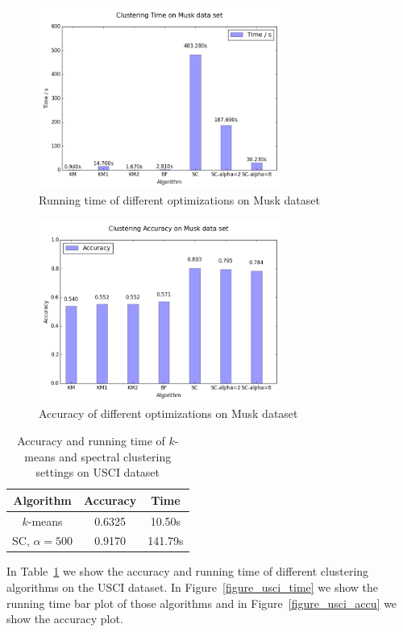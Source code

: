 \documentclass{acm_proc_article-sp}
\begin{document}
\begin{figure}
\centering
\includegraphics[height=6cm]{mt.png}
\caption{Running time of different optimizations on Musk dataset}
\label{figure_musk_time}
\end{figure}

\begin{figure}
\centering
\includegraphics[height=6cm]{ma.png}
\caption{Accuracy of different optimizations on Musk dataset}
\label{figure_musk_accu}
\end{figure}


\begin{table}
\centering
\begin{tabular}{|c|cc|}
\hline
Algorithm & Accuracy & Time \\
\hline
 $k$-means & 0.6325 & 10.50s\\
 SC, $\alpha=500$ & 0.9170 & 141.79s\\
 \hline
\end{tabular}
\caption{Accuracy and running time of $k$-means and spectral clustering settings on USCI dataset}
\label{table_usci}
\end{table}


In Table~\ref{table_usci} we show the accuracy and running time of different clustering algorithms on the USCI dataset. In Figure~\ref{figure_usci_time} we show the running time bar plot of those algorithms and in Figure~\ref{figure_usci_accu} we show the accuracy plot. 
\end{document}
